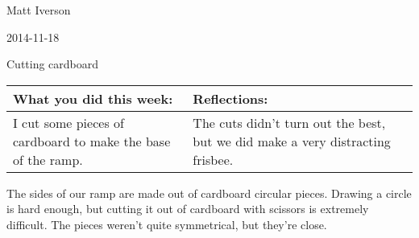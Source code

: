 Matt Iverson

2014-11-18

Cutting cardboard

\begin{tabular}{|p{5cm}|p{5cm}|}
 \hline
 What you did this week:
 &
 Reflections:
 \\
 \hline
 I cut some pieces of cardboard to make the base of the ramp.
 &
 The cuts didn't turn out the best, but we did make a very distracting frisbee.
 \\
 \hline
\end{tabular}


The sides of our ramp are made out of cardboard circular pieces. Drawing a circle is hard enough, but cutting it out of cardboard with scissors is extremely difficult. The pieces weren't quite symmetrical, but they're close.
